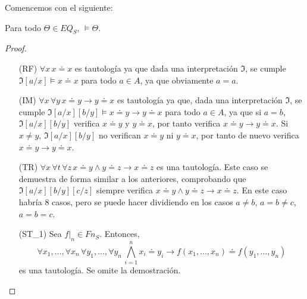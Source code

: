 Comencemos con el siguiente:

\begin{lema}\label{eq}
Para todo $\Theta \in EQ_S$, $\vDash \Theta$. 
\end{lema}
\begin{proof} \mbox{}
\begin{itemize}
        \item[(RF)] $\forall x \, x \doteq x$ es tautología ya que dada una interpretación $\mathfrak{I}$, se cumple $\mathfrak{I}[a/x] \vDash x \doteq x$ para todo $a \in A$, ya que obviamente $a=a$.
        \item[(IM)] $\forall x \, \forall y \, x \doteq y \rightarrow y \doteq x$ es tautología ya que, dada una interpretación $\mathfrak{I}$, se cumple $\mathfrak{I}[a/x][b/y] \vDash x \doteq y \rightarrow y \doteq x$ para todo $a \in A$, ya que si $a=b$, $\mathfrak{I}[a/x][b/y]$ verifica $x \doteq y$ y $y \doteq x$, por tanto verifica $x \doteq y \rightarrow y \doteq x$. Si $x\neq y$, $\mathfrak{I}[a/x][b/y]$ no verifican $x \doteq y$ ni $y \doteq x$, por tanto de nuevo verifica $x \doteq y \rightarrow y \doteq x$.
        \item[(TR)] $\forall x \, \forall t \, \forall z \, x \doteq y \land y \doteq z \rightarrow x \doteq z$ es una tautología. Este caso se demuestra de forma similar a los anteriores, comprobando que $\mathfrak{I}[a/x][b/y][c/z]$ siempre verifica $x \doteq y \land y \doteq z \rightarrow x \doteq z$. En este caso habría 8 casos, pero se puede hacer dividiendo en los casos $a\neq b$, $a=b\neq c$, $a=b=c$.
        \item[(ST_{1})] Sea $f|_n \in Fn_S$. Entonces, $$\forall x_1, \dots, \forall x_n \, \forall y_1, \dots, \forall y_n \, \bigwedge\limits_{i = 1}^{n} x_i \doteq y_i \rightarrow f(x_1, \dots, x_n) \doteq f(y_1, \dots, y_n)$$ es una tautología. Se omite la demostración.

\end{itemize}
\end{proof}
